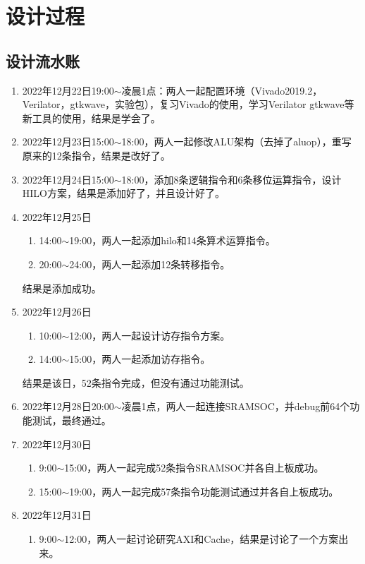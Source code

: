 \section{设计过程}
\subsection{设计流水账}

\begin{enumerate}
    \item 2022年12月22日19:00$\sim$凌晨1点：两人一起配置环境（Vivado2019.2，Verilator，gtkwave，实验包），复习Vivado的使用，学习Verilator gtkwave等新工具的使用，结果是学会了。
    \item 2022年12月23日15:00$\sim$18:00，两人一起修改ALU架构（去掉了aluop），重写原来的12条指令，结果是改好了。
    \item 2022年12月24日15:00$\sim$18:00，\stunameb 添加8条逻辑指令和6条移位运算指令，\stunamea 设计HILO方案，结果是添加好了，并且设计好了。
    \item 2022年12月25日
    \begin{enumerate}[(1)]
        \item 14:00$\sim$19:00，两人一起添加hilo和14条算术运算指令。
        \item 20:00$\sim$24:00，两人一起添加12条转移指令。
    \end{enumerate}
    结果是添加成功。
    \item 2022年12月26日
    \begin{enumerate}[(1)]
        \item 10:00$\sim$12:00，两人一起设计访存指令方案。
        \item 14:00$\sim$15:00，两人一起添加访存指令。
    \end{enumerate}
    结果是该日，52条指令完成，但没有通过功能测试。
    \item 2022年12月28日20:00$\sim$凌晨1点，两人一起连接SRAMSOC，并debug前64个功能测试，最终通过。
    \item 2022年12月30日
    \begin{enumerate}[(1)]
        \item 9:00$\sim$15:00，两人一起完成52条指令SRAMSOC并各自上板成功。
        \item 15:00$\sim$19:00，两人一起完成57条指令功能测试通过并各自上板成功。
    \end{enumerate}
    \item 2022年12月31日
    \begin{enumerate}[(1)]
        \item 9:00$\sim$12:00，两人一起讨论研究AXI和Cache，结果是讨论了一个方案出来。

\end{enumerate}
\end{enumerate}
